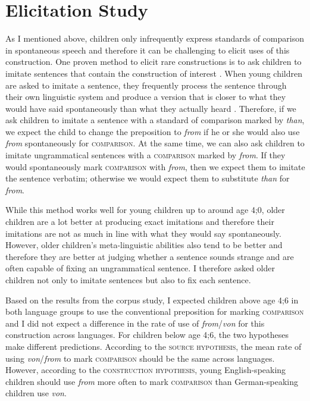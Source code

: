 \documentclass[lucida]{sp} %
\begin{document}
\section{Elicitation Study}
\label{sec:experiment}

As I mentioned above, children only infrequently express standards of comparison in spontaneous speech and therefore it can be challenging to elicit uses of this construction. One proven method to elicit rare constructions is to ask children to imitate sentences that contain the construction of interest \citep{clark1989b}. When young children are asked to imitate a sentence, they frequently process the sentence through their own linguistic system and produce a version that is closer to what they would have said spontaneously than what they actually heard \citep{slobin1967}. Therefore, if we ask children to imitate a sentence with a standard of comparison marked by \textit{than}, we expect the child to change the preposition to \textit{from} if he or she would also use \textit{from} spontaneously for \textsc{comparison}. At the same time, we can also ask children to imitate ungrammatical sentences with a \textsc{comparison} marked by \textit{from}. If they would spontaneously mark \textsc{comparison} with \textit{from}, then we expect them to imitate the sentence verbatim; otherwise we would expect them to substitute \textit{than} for \textit{from}.

While this method works well for young children up to around age 4;0, older children are a lot better at producing exact imitations \citep{clark1989b} and therefore their imitations are not as much in line with what they would say spontaneously.  However, older children's meta-linguistic abilities also tend to be better and therefore they are better at judging whether a sentence sounds strange and are often capable of fixing an ungrammatical sentence. I therefore asked older children not only to imitate sentences but also to fix each sentence.

Based on the results from the corpus study, I expected children above age 4;6 in both language groups to use the conventional preposition for marking \textsc{comparison} and I did not expect a difference in the rate of use of \textit{from}/\textit{von} for this construction across languages. For children below age 4;6, the two hypotheses make different predictions. According to the \textsc{source hypothesis}, the mean rate of using \textit{von}/\textit{from} to mark \textsc{comparison} should be the same across languages. However, according to the \textsc{construction hypothesis}, young English-speaking children should use \textit{from} more often to mark \textsc{comparison} than German-speaking children use \textit{von}.
\end{document}
